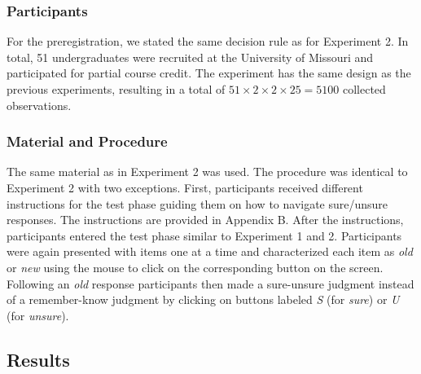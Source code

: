 \documentclass[english,,man]{apa6}
\begin{document}
\hypertarget{participants-1}{%
\subsubsection{Participants}\label{participants-1}}

For the preregistration, we stated the same decision rule as for Experiment 2. In total, 51 undergraduates were recruited at the University of Missouri and participated for partial course credit. The experiment has the same design as the previous experiments, resulting in a total of \(51 \times 2 \times 2 \times 25 = 5100\) collected observations.

\hypertarget{material-and-procedure}{%
\subsubsection{Material and Procedure}\label{material-and-procedure}}

The same material as in Experiment 2 was used. The procedure was identical to Experiment 2 with two exceptions. First, participants received different instructions for the test phase guiding them on how to navigate sure/unsure responses. The instructions are provided in Appendix B. After the instructions, participants entered the test phase similar to Experiment 1 and 2. Participants were again presented with items one at a time and characterized each item as \emph{old} or \emph{new} using the mouse to click on the corresponding button on the screen. Following an \emph{old} response participants then made a sure-unsure judgment instead of a remember-know judgment by clicking on buttons labeled \emph{S} (for \emph{sure}) or \emph{U} (for \emph{unsure}).

\hypertarget{results-2}{%
\subsection{Results}\label{results-2}}
\end{document}
